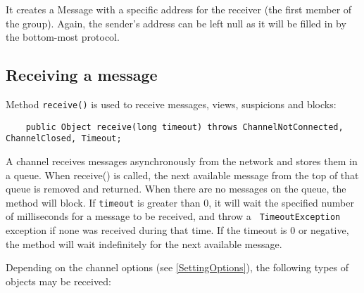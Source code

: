     It creates a Message with a specific address for the receiver (the first member
    of the group). Again, the sender's address can be left null as it will be filled
    in by the bottom-most protocol.

	
    \subsection{Receiving a message}

    Method {\tt receive()} is used to receive messages, views, suspicions and blocks:	

    \begin{small}
    \begin{verbatim}
    public Object receive(long timeout) throws ChannelNotConnected, ChannelClosed, Timeout;
    \end{verbatim}
    \end{small}

    A channel receives messages asynchronously from the network and stores them in a
    queue. When receive() is called, the next available message from the top of that
    queue is removed and returned. When there are no messages on the queue, the
    method will block. If {\tt timeout} is greater than 0, it will wait the specified
    number of milliseconds for a message to be received, and throw a {\tt
    TimeoutException} exception if none was received during that time. If the timeout
    is 0 or negative, the method will wait indefinitely for the next available
    message.

    Depending on the channel options (see \ref{SettingOptions}), the following
    types of objects may be received:

